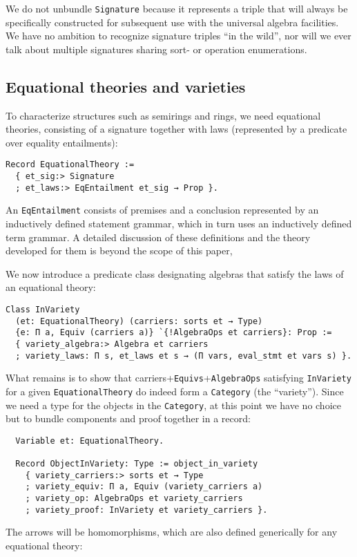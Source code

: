 \documentclass[a4paper,10pt,runningheads]{llncs}
\begin{document}
We do not unbundle \lstinline|Signature| because it represents a triple that will always be specifically constructed for subsequent use with the universal algebra facilities. We have no ambition to recognize signature triples ``in the wild'', nor will we ever talk about multiple signatures sharing sort- or operation enumerations.

\subsection{Equational theories and varieties}
\label{varieties}

To characterize structures such as semirings and rings, we need equational theories, consisting of a signature together with laws (represented by a predicate over equality entailments):
\begin{lstlisting}
Record EquationalTheory :=
  { et_sig:> Signature
  ; et_laws:> EqEntailment et_sig → Prop }.
\end{lstlisting}
An \lstinline|EqEntailment| consists of premises and a conclusion represented by an inductively defined statement grammar, which in turn uses an inductively defined term grammar. A detailed discussion of these definitions and the theory developed for them is beyond the scope of this paper, 

We now introduce a predicate class designating algebras that satisfy the laws of an equational theory:
\begin{lstlisting}
Class InVariety
  (et: EquationalTheory) (carriers: sorts et → Type)
  {e: Π a, Equiv (carriers a)} `{!AlgebraOps et carriers}: Prop :=
  { variety_algebra:> Algebra et carriers
  ; variety_laws: Π s, et_laws et s → (Π vars, eval_stmt et vars s) }.
\end{lstlisting}

What remains is to show that carriers+\lstinline|Equivs|+\lstinline|AlgebraOps| satisfying \lstinline|InVariety| for a given \lstinline|EquationalTheory| do indeed form a \lstinline|Category| (the ``variety''). Since we need a type for the objects in the \lstinline|Category|, at this point we have no choice but to bundle components and proof together in a record:
\begin{lstlisting}
  Variable et: EquationalTheory.

  Record ObjectInVariety: Type := object_in_variety
    { variety_carriers:> sorts et → Type
    ; variety_equiv: Π a, Equiv (variety_carriers a)
    ; variety_op: AlgebraOps et variety_carriers
    ; variety_proof: InVariety et variety_carriers }.
\end{lstlisting}
The arrows will be homomorphisms, which are also defined generically for any equational theory:
\end{document}
